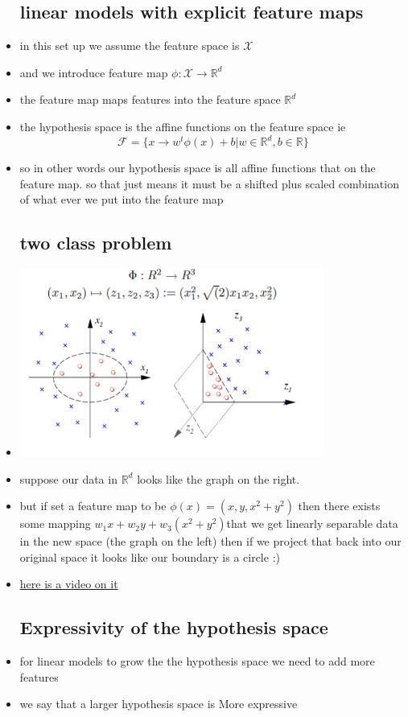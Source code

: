\documentclass{article}
\begin{document}
\begin{itemize}
\subsection{linear models with explicit feature maps }
\item in this set up we assume the feature space is $\mathcal{X}$
\item and we introduce feature map $\phi:\mathcal{X}\rightarrow \mathbb{R}^{d}$
\item the feature map maps features into the feature space $\mathbb{R}^{d}$
\item the hypothesis space is the affine functions on the feature space ie $$\mathcal{F}=\{ x\rightarrow w^{t}\phi(x)+b|w\in \mathbb{R}^{d}, b\in \mathbb{R}  \}$$
\item so in other words our hypothesis space is all affine functions that on the feature map. so that just means it must be a shifted plus scaled combination of what ever we put into the feature map 
\subsection{two class problem}
\item \includegraphics[width=10cm]{lecture_notes/lecture_5/immage/l_5_1.jpg}
\item suppose our data in $\mathbb{R}^{d}$ looks like the graph on the right. 
\item but if set a feature map to be $\phi(x)=(x,y,x^2+y^2)$ then there exists some mapping $w_1x+w_2y+w_3(x^2+y^2)$that we get linearly separable data in the new space (the graph on the left) then if we project that back into our original space it looks like our  boundary is a circle :)
\item \href{https://www.youtube.com/watch?v=3liCbRZPrZA}{here is a video on it}
\subsection{Expressivity  of the hypothesis space}
\item for linear models to grow the the hypothesis space we need to add more features
\item we say that a larger hypothesis space is More expressive

\end{itemize}
\end{document}
